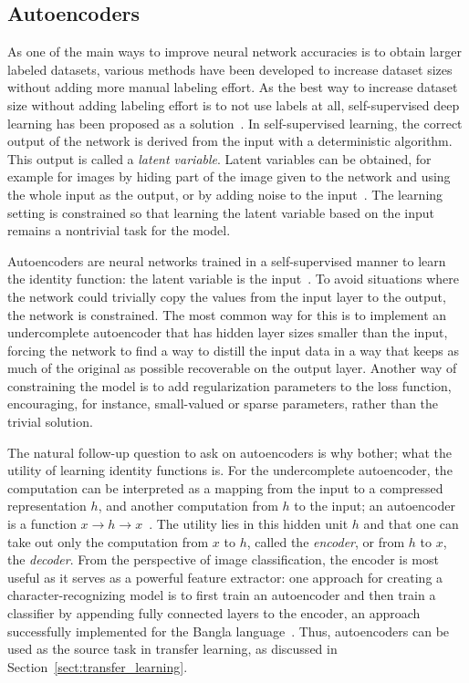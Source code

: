 \documentclass[english,twoside,openright]{UH_DS_MSc}
\begin{document}
\subsection{Autoencoders}
\label{sect:autoencoders}

As one of the main ways to improve neural network accuracies is to obtain larger labeled datasets, various methods have been developed to increase dataset sizes without adding more manual labeling effort. As the best way to increase dataset 
size without adding labeling effort is to not use labels at all, self-supervised deep learning has been proposed 
as a solution~\cite{goodfellow}. In self-supervised learning, the correct output of the network is
derived from the input with a deterministic algorithm. This output is called a \textit{latent variable}.
Latent variables can be obtained, for example for images by hiding part of the image given to the network
and using the whole input as the output, or by adding noise to the input~\cite{princebook}.
The learning setting is constrained so that learning the latent variable 
based on the input remains a nontrivial task for the model.

Autoencoders are neural networks trained in a self-supervised manner to learn the identity function: the latent 
variable is the input~\cite{goodfellow}. To avoid situations where the network could trivially copy the values from 
the input layer to the output, the network is constrained. The most common way for this is to implement an undercomplete
autoencoder that has hidden layer sizes smaller than the input, forcing the network to find a way to distill 
the input data in a way that keeps as much of the original as possible recoverable on the output layer.
Another way of constraining the model is to add regularization parameters to the 
loss function, encouraging, for instance, small-valued or sparse parameters, rather than the trivial solution.

The natural follow-up question to ask on autoencoders is why bother; what the utility 
of learning identity functions is. For the undercomplete autoencoder, the computation 
can be interpreted as a mapping from the input to a compressed representation $h$, and 
another computation from $h$ to the input; an autoencoder is a function $x\to h\to x$~\cite{goodfellow}.
The utility lies in this hidden unit $h$ and that one can take out only the 
computation from $x$ to $h$, called the \textit{encoder}, or from $h$ to $x$, the \textit{decoder}.
From the perspective of image classification, the encoder is most useful as it serves 
as a powerful feature extractor: one approach for creating a character-recognizing model 
is to first train an autoencoder and then train a classifier by appending 
fully connected layers to the encoder, an approach successfully implemented for the Bangla language~\cite{6shoponBangla}.
Thus, autoencoders can be used as the source 
task in transfer learning, as discussed in Section~\ref{sect:transfer_learning}.
\end{document}
